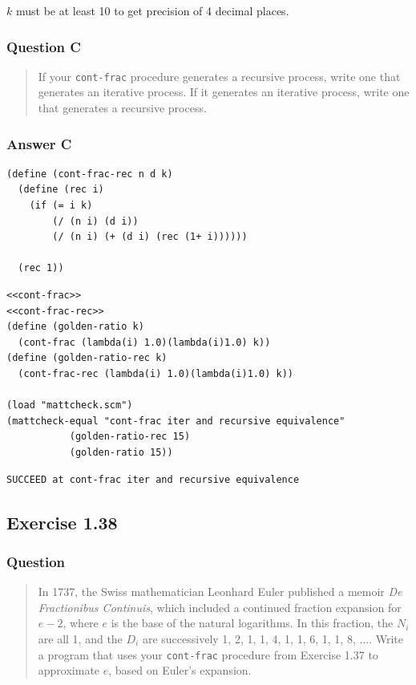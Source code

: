 \documentclass[final,fleqn,titlepage,twoside]{article}
\begin{document}
\(k\) must be at least 10 to get precision of 4 decimal places.

\subsubsection{Question C}
\label{sec:org8b42815}
\begin{quote}
If your \texttt{cont-frac} procedure generates a recursive process, write one
that generates an iterative process. If it generates an iterative process, write
one that generates a recursive process.
\end{quote}

\subsubsection{Answer C}
\label{sec:org74d27af}
\begin{verbatim}
(define (cont-frac-rec n d k)
  (define (rec i)
    (if (= i k)
        (/ (n i) (d i))
        (/ (n i) (+ (d i) (rec (1+ i))))))

  (rec 1))
\end{verbatim}
\begin{verbatim}
<<cont-frac>>
<<cont-frac-rec>>
(define (golden-ratio k)
  (cont-frac (lambda(i) 1.0)(lambda(i)1.0) k))
(define (golden-ratio-rec k)
  (cont-frac-rec (lambda(i) 1.0)(lambda(i)1.0) k))

(load "mattcheck.scm")
(mattcheck-equal "cont-frac iter and recursive equivalence"
           (golden-ratio-rec 15)
           (golden-ratio 15))
\end{verbatim}

\begin{verbatim}
SUCCEED at cont-frac iter and recursive equivalence
\end{verbatim}

\subsection{Exercise 1.38}
\label{sec:orgdd7d2a1}
\subsubsection{Question}
\label{sec:org0849820}
\begin{quote}
In 1737, the Swiss mathematician Leonhard Euler published a memoir \emph{De
Fractionibus Continuis}, which included a continued fraction expansion for \(e -
2\), where \(e\) is the base of the natural logarithms. In this fraction, the
\(N_i\) are all 1, and the \(D_i\) are successively 1, 2, 1, 1, 4, 1, 1, 6, 1,
1, 8, \(\dots\). Write a program that uses your \texttt{cont-frac} procedure
from Exercise 1.37 to approximate \(e\), based on Euler's expansion.
\end{quote}
\end{document}
